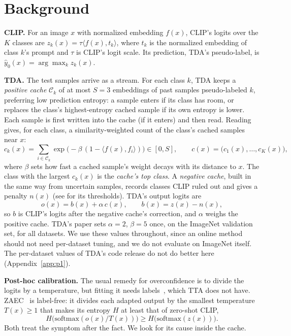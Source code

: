 \documentclass[10pt]{article}
\begin{document}
\section{Background}\label{sec:background}
\textbf{CLIP.} For an image $x$ with normalized embedding $f(x)$, CLIP's logits over the $K$ classes are
$z_k(x) = \tau \langle f(x), t_k \rangle$, where $t_k$ is the normalized embedding of class $k$'s prompt and $\tau$ is
CLIP's logit scale. Its prediction, TDA's pseudo-label, is $\hat y_0(x) = \arg\max_k z_k(x)$.

\textbf{TDA.} The test samples arrive as a stream. For each class $k$, TDA keeps a \emph{positive cache} $\mathcal C_k$
of at most $S=3$ embeddings of past samples pseudo-labeled $k$, preferring low prediction entropy: a sample enters if its
class has room, or replaces the class's highest-entropy cached sample if its own entropy is lower. Each sample is first
written into the cache (if it enters) and then read. Reading gives, for each class, a similarity-weighted count of the
class's cached samples near $x$:
\begin{equation}
c_k(x) = \sum_{i \in \mathcal{C}_k} \exp\!\big(-\beta\,(1 - \langle f(x), f_i\rangle)\big) \in [0, S],
\qquad c(x) = \big(c_1(x), \dots, c_K(x)\big),
\label{eq:cache}
\end{equation}
where $\beta$ sets how fast a cached sample's weight decays with its distance to $x$. The class with the largest $c_k(x)$
is the \emph{cache's top class}. A \emph{negative cache}, built in the same way from uncertain samples, records classes
CLIP ruled out and gives a penalty $n(x)$ (see \citet{karmanov2024tda} for its thresholds). TDA's output logits are
\begin{equation}
o(x) = b(x) + \alpha\, c(x), \qquad b(x) = z(x) - n(x),
\label{eq:tda}
\end{equation}
so $b$ is CLIP's logits after the negative cache's correction, and $\alpha$ weighs the positive cache. TDA's paper sets
$\alpha = 2$, $\beta = 5$ once, on the ImageNet validation set, for all datasets. We use these values throughout, since
an online method should not need per-dataset tuning, and we do not evaluate on ImageNet itself. The per-dataset values
of TDA's code release do not do better here (Appendix~\ref{app:p1}).

\textbf{Post-hoc calibration.} The usual remedy for overconfidence is to divide the logits by a temperature, but
fitting it needs labels~\cite{guo2017calibration}, which TTA does not have. ZAEC~\cite{jiang2026zaec} is label-free: it
divides each adapted output by the smallest temperature $T(x) \ge 1$ that makes its entropy $H$ at least that of
zero-shot CLIP,
\begin{equation}
H\big(\mathrm{softmax}(o(x)/T(x))\big) \ge H\big(\mathrm{softmax}(z(x))\big).
\label{eq:zaec}
\end{equation}
Both treat the symptom after the fact. We look for its cause inside the cache.
\end{document}
